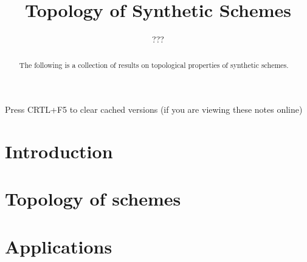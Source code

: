 \documentclass{../util/zariski}
\title{Topology of Synthetic Schemes}
\author{???}
\begin{document}
\maketitle

\begin{center}
  \color{purple}
  \large{Press CRTL+F5 to clear cached versions}
  \large{(if you are viewing these notes online)}
\end{center}

\begin{abstract}
  The following is a collection of results on topological properties of synthetic schemes.
\end{abstract}

\tableofcontents

\section*{Introduction}


\section{Topology of schemes}


\section{Applications}


\printindex

\printbibliography
\end{document}
